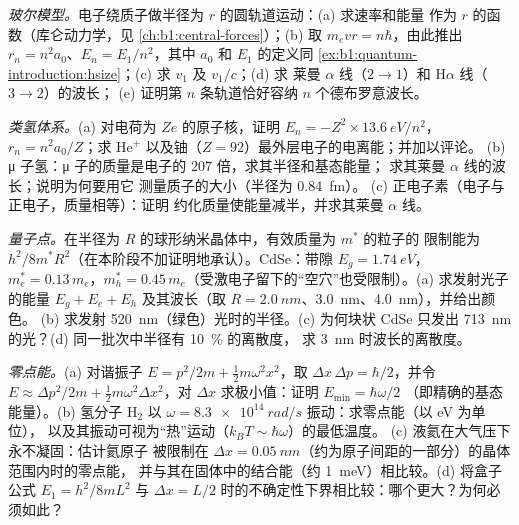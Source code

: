 \begin{exercise}[$\star\star$]\label{exo:b1:quantum-introduction:9}
\emph{玻尔模型。}电子绕质子做半径为 $r$ 的圆轨道运动：(a) 求速率和能量
作为 $r$ 的函数（库仑动力学，见
\cref{ch:b1:central-forces}）；(b) 取 $m_evr = n\hbar$，由此推出
$r_n = n^2a_0$、$E_n = E_1/n^2$，其中 $a_0$ 和 $E_1$ 的定义同
\cref{ex:b1:quantum-introduction:hsize}；(c) 求 $v_1$ 及 $v_1/c$；(d) 求
莱曼 $\alpha$ 线（$2 \to 1$）和 H$\alpha$ 线（$3 \to 2$）的波长；
(e) 证明第 $n$ 条轨道恰好容纳 $n$ 个德布罗意波长。
\end{exercise}

\begin{exercise}[$\star\star\star$]\label{exo:b1:quantum-introduction:10}
\emph{类氢体系。}(a) 对电荷为 $Ze$ 的原子核，证明
$E_n = -Z^2 \times \qty{13.6}{eV}/n^2$，$r_n = n^2a_0/Z$；求
He$^+$ 以及铀（$Z = 92$）最外层电子的电离能；并加以评论。
(b) μ 子氢：μ 子的质量是电子的 $207$ 倍，求其半径和基态能量；
求其莱曼 $\alpha$ 线的波长；说明为何要用它
测量质子的大小（半径为 \qty{0.84}{fm}）。
(c) 正电子素（电子与正电子，质量相等）：证明
约化质量使能量减半，并求其莱曼 $\alpha$ 线。
\end{exercise}

\begin{exercise}[$\star\star\star$]\label{exo:b1:quantum-introduction:11}
\emph{量子点。}在半径为 $R$ 的球形纳米晶体中，有效质量为 $m^\ast$ 的粒子的
限制能为 $h^2/8m^\ast R^2$（在本阶段不加证明地承认）。CdSe：带隙 $E_g = \qty{1.74}{eV}$，
$m_e^\ast =
0.13\,m_e$，$m_h^\ast = 0.45\,m_e$（受激电子留下的“空穴”也受限制）。(a) 求发射光子的能量
$E_g + E_e + E_h$ 及其波长（取 $R = \qty{2.0}{nm}$、\qty{3.0}{nm}、\qty{4.0}{nm}），并给出颜色。
(b) 求发射 \qty{520}{nm}（绿色）光时的半径。(c) 为何块状 CdSe
只发出 \qty{713}{nm} 的光？(d) 同一批次中半径有 \qty{10}{\percent} 的离散度，
求 \qty{3}{nm} 时波长的离散度。
%
\end{exercise}

\begin{exercise}[$\star\star\star$]\label{exo:b1:quantum-introduction:12}
\emph{零点能。}(a) 对谐振子 $E = p^2/2m +
\tfrac12m\omega^2x^2$，取 $\Delta x\,\Delta p = \hbar/2$，并令 $E \approx
\Delta p^2/2m + \tfrac12m\omega^2\Delta x^2$，对 $\Delta x$ 求极小值：证明 $E_{\min} = \hbar\omega/2$
（即精确的基态能量）。(b) 氢分子 H$_2$ 以 $\omega =
\qty{8.3e14}{rad/s}$ 振动：求零点能（以 eV 为单位），
以及其振动可视为“热”运动（$k_BT \sim \hbar\omega$）的最低温度。
(c) 液氦在大气压下永不凝固：估计氦原子
被限制在 $\Delta x = \qty{0.05}{nm}$（约为原子间距的一部分）的晶体范围内时的零点能，
并与其在固体中的结合能（约 \qty{1}{meV}）相比较。(d) 将盒子公式
$E_1 = h^2/8mL^2$ 与
$\Delta x = L/2$ 时的不确定性下界相比较：哪个更大？为何必须如此？
\end{exercise}

